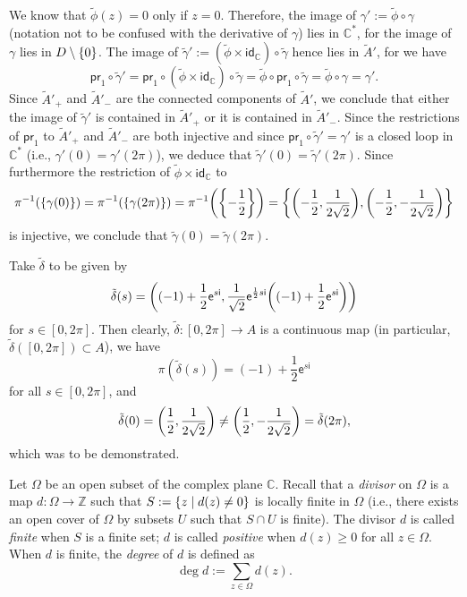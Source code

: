 \documentclass[a4paper]{amsart}
\newcommand{\Z}{\mathbb{Z}}
\newcommand{\C}{\mathbb{C}}
\newcommand{\id}[1]{\mathsf{id}_{#1}}
\newcommand{\ee}[1]{\mathsf{e}^{#1}}
\newcommand{\ii}{\mathsf{i}}
\newcommand{\pr}[1]{\mathsf{pr}_{#1}}
\theoremstyle{remark}
\numberwithin{equation}{question}
\DeclarePairedDelimiter\set{\{}{\}}
\DeclarePairedDelimiter\paren{(}{)}
\begin{document}
\begin{solution}
\begin{solenum}
We know that $\tilde\phi(z) = 0$ only if $z = 0$. Therefore, the image of $\gamma' := \tilde\phi \circ \gamma$ (notation not to be confused with the derivative of $\gamma$) lies in $\C^*$, for the image of $\gamma$ lies in $D \setminus \set0$. The image of $\tilde\gamma' := (\tilde\phi \times \id\C) \circ \tilde\gamma$ hence lies in $\tilde A'$, for we have
\[
\pr1 \circ \tilde\gamma' = \pr1 \circ (\tilde\phi \times \id\C) \circ \tilde\gamma = \tilde\phi \circ \pr1 \circ \tilde\gamma = \tilde\phi \circ \gamma = \gamma'.
\]
Since $\tilde A'_+$ and $\tilde A'_-$ are the connected components of $\tilde A'$, we conclude that either the image of $\tilde\gamma'$ is contained in $\tilde A'_+$ or it is contained in $\tilde A'_-$. Since the restrictions of $\pr1$ to $\tilde A'_+$ and $\tilde A'_-$ are both injective and since $\pr1 \circ \tilde\gamma' = \gamma'$ is a closed loop in $\C^*$ (i.e., $\gamma'(0) = \gamma'(2\pi)$), we deduce that $\tilde\gamma'(0) = \tilde\gamma'(2\pi)$. Since furthermore the restriction of $\tilde\phi \times \id\C$ to
\[
\pi^{-1}(\set{\gamma(0)}) = \pi^{-1}(\set{\gamma(2\pi)}) = \pi^{-1}\paren*{\set*{-\frac12}} = \set*{\paren*{-\frac12,\frac1{2\sqrt2}},\paren*{-\frac12,-\frac1{2\sqrt2}}}
\]
is injective, we conclude that $\tilde\gamma(0) = \tilde\gamma(2\pi)$.

\item Take $\tilde\delta$ to be given by
\[
\tilde\delta(s) = \paren*{(-1) + \frac12\ee{s\ii}, \frac1{\sqrt2}\ee{\frac12s\ii}\paren*{(-1) + \frac12\ee{s\ii}}}
\]
for $s \in [0,2\pi]$. Then clearly, $\tilde\delta \colon [0,2\pi] \to A$ is a continuous map (in particular, $\tilde\delta([0,2\pi]) \subset A$), we have
\[
\pi(\tilde\delta(s)) = (-1) + \frac12\ee{s\ii}
\]
for all $s \in [0,2\pi]$, and
\[
\tilde\delta(0) = \paren*{\frac12,\frac1{2\sqrt2}} \ne \paren*{\frac12, -\frac1{2\sqrt2}} = \tilde\delta(2\pi),
\]
which was to be demonstrated.
\end{solenum} 
\end{solution}

\begin{question}[subtitle=The topology of the divisor map, use=false]
Let $\Omega$ be an open subset of the complex plane $\C$. Recall that a \emph{divisor} on $\Omega$ is a map $d \colon \Omega \to \Z$ such that $S := \set{z \mid d(z) \ne 0}$ is locally finite in $\Omega$ (i.e., there exists an open cover of $\Omega$ by subsets $U$ such that $S \cap U$ is finite). The divisor $d$ is called \emph{finite} when $S$ is a finite set; $d$ is called \emph{positive} when $d(z) \ge 0$ for all $z \in \Omega$. When $d$ is finite, the \emph{degree} of $d$ is defined as
\[
\deg d := \sum_{z \in \Omega} d(z).
\]
\end{question}
\end{document}
